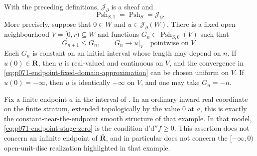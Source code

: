 \begin{theorem}
\label{thm:p071-cld-constant-collar-endpoint}
With the preceding definitions, \(\mathscr J_{\partial}\) is a sheaf and
\begin{equation}
 \operatorname{Psh}_{S,1}
 =\operatorname{Psh}_S
 =\mathscr J_{\partial}.
 \label{eq:p071-endpoint-first-stage-collapse}
\end{equation}
More precisely, suppose that \(0\in W\) and
\(u\in\mathscr J_{\partial}(W)\).  There is a fixed open neighbourhood
\(V=[0,r)\subseteq W\) and functions
\(G_n\in\operatorname{Psh}_{S,0}(V)\) such that
\begin{equation}
 G_{n+1}\leq G_n,
 \qquad
 G_n\longrightarrow u|_V
 \quad\text{pointwise on }V.
 \label{eq:p071-endpoint-fixed-domain-approximation}
\end{equation}
Each \(G_n\) is constant on an initial interval whose length may depend
on \(n\).  If \(u(0)\in\mathbf R\), then \(u\) is real-valued and
continuous on \(V\), and the convergence in
\eqref{eq:p071-endpoint-fixed-domain-approximation} can be chosen uniform
on \(V\).  If \(u(0)=-\infty\), then \(u\) is identically \(-\infty\) on
\(V\), and one may take \(G_n=-n\).

Fix a finite endpoint \(a\) in the interval of
\cite[Example~6.7.2]{CLD25}.  In an ordinary inward real coordinate on the
finite stratum, extended topologically by the value \(0\) at \(a\), this is
exactly the constant-near-the-endpoint smooth structure of that example.  In
that model,
\eqref{eq:p071-endpoint-stage-zero} is the condition
\(\mathrm d'\mathrm d''f\geq0\).
This assertion does not concern an infinite endpoint of
\(\overline{\mathbf R}\), and in particular does not concern the
\([-\infty,0)\) open-unit-disc realization highlighted in that example.
\end{theorem}

